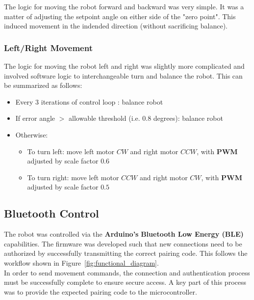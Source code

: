 \documentclass{article}
\begin{document}
\begin{minipage}{\linewidth}
    The logic for moving the robot forward and backward was very simple. It was a matter of adjusting the setpoint angle on either side of the "zero point".
    This induced movement in the indended direction (without sacrificing balance). \\
\end{minipage}

\subsubsection{Left/Right Movement}

\begin{minipage}{\linewidth}
    The logic for moving the robot left and right was slightly more complicated and involved
    software logic to interchangeable turn and balance the robot. This can be summarized as follows: \\
\end{minipage}

\begin{itemize}
    \item Every 3 iterations of control loop : balance robot
    \item If error angle $>$ allowable threshold (i.e. 0.8 degrees): balance robot
    \item Otherwise:
    \begin{itemize}
        \item To turn left: move left motor $CW$ and right motor $CCW$, with \textbf{PWM} adjusted by scale factor $0.6$
        \item To turn right: move left motor $CCW$ and right motor $CW$,  with \textbf{PWM} adjusted by scale factor $0.5$
    \end{itemize}
\end{itemize}

\subsection{Bluetooth Control}

\begin{minipage}{\linewidth}
    The robot was controlled via the \textbf{Arduino's} \textbf{Bluetooth Low Energy (BLE)} capabilities.
    The firmware was developed such that new connections need to be authorized by successfully transmitting
    the correct pairing code. This follows the workflow shown in Figure~\ref{fig:functional_diagram}. \\

    In order to send movement commands, the connection and authentication process must be successfully complete to ensure secure access. A key
    part of this process was to provide the expected pairing code to the microcontroller. \\
\end{minipage}
\end{document}
